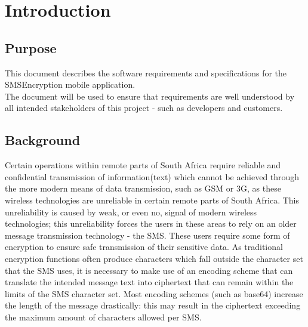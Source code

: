 \section{Introduction}

\subsection{Purpose}
This document describes the software requirements and specifications for the SMSEncryption mobile application.
\vspace{10pt}\\
The document will be used to ensure that requirements are well understood by all intended stakeholders of this project - such as developers and customers.

\subsection{Background}
Certain operations within remote parts of South Africa require reliable and confidential transmission of information(text) which cannot be achieved through the more modern means of data transmission, such as GSM or 3G, as these wireless technologies are unreliable in certain remote parts of South Africa. This unreliability is caused by weak, or even no, signal of modern wireless technologies; this unreliability forces the users in these areas to rely on an older message transmission technology - the SMS. These users require some form of encryption to ensure safe transmission of their sensitive data. As traditional encryption functions often produce characters which fall outside the character set that the SMS uses, it is necessary to make use of an encoding scheme that can translate the intended message text into ciphertext that can remain within the limits of the SMS character set. Most encoding schemes (such as base64) increase the length of the message drastically: this may result in the ciphertext exceeding the maximum amount of characters allowed per SMS.
